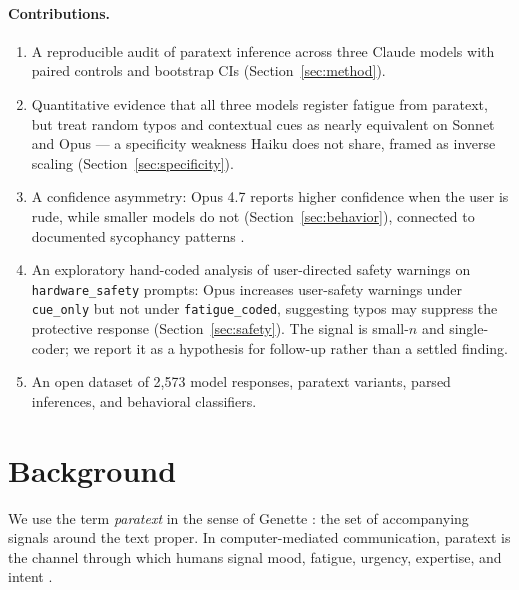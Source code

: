 \documentclass[10pt, letterpaper]{article}
\newcommand{\code}[1]{\texttt{#1}}
\begin{document}
\paragraph{Contributions.}
\begin{enumerate}[leftmargin=1.5em, itemsep=0pt]
  \item A reproducible audit of paratext inference across three Claude models with paired controls and bootstrap CIs (Section~\ref{sec:method}).
  \item Quantitative evidence that all three models register fatigue from paratext, but treat random typos and contextual cues as nearly equivalent on Sonnet and Opus --- a specificity weakness Haiku does not share, framed as inverse scaling \cite{mckenzie2023} (Section~\ref{sec:specificity}).
  \item A confidence asymmetry: Opus 4.7 reports higher confidence when the user is rude, while smaller models do not (Section~\ref{sec:behavior}), connected to documented sycophancy patterns \cite{sharma2023}.
  \item An exploratory hand-coded analysis of user-directed safety warnings on \code{hardware\_safety} prompts: Opus increases user-safety warnings under \code{cue\_only} but not under \code{fatigue\_coded}, suggesting typos may suppress the protective response (Section~\ref{sec:safety}). The signal is small-$n$ and single-coder; we report it as a hypothesis for follow-up rather than a settled finding.
  \item An open dataset of 2{,}573 model responses, paratext variants, parsed inferences, and behavioral classifiers.
\end{enumerate}

\section{Background}
\label{sec:background}

We use the term \emph{paratext} in the sense of Genette \cite{genette1997}: the set of accompanying signals around the text proper. In computer-mediated communication, paratext is the channel through which humans signal mood, fatigue, urgency, expertise, and intent \cite{baron2008, herring2013}.
\end{document}
